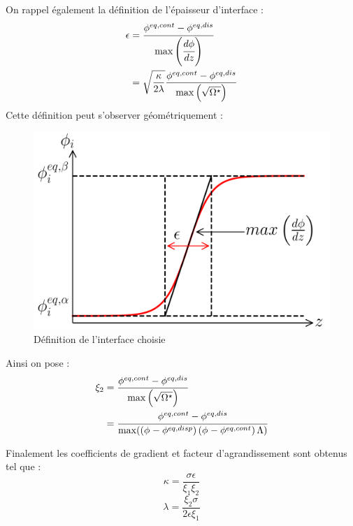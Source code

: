 On rappel également la définition de l'épaisseur d'interface :
\begin{align}
\epsilon&= \cfrac{\phi_{}^{eq,cont}-\phi_{}^{eq,dis}}{\max\left(\cfrac{d\phi_{}}{dz}\right)}
\\
&=\sqrt{\frac{\kappa}{2\lambda}}\frac{\phi^{eq,cont}-\phi^{eq,dis}}{\max\left(\sqrt{\Omega^{\star}}\right)}
\end{align}
Cette définition peut s'observer géométriquement :
\begin{figure}[H]
	\centering
	\includegraphics[width=0.3\linewidth]{figure/fig_interface}
	\caption{Définition de l'interface choisie}
	\label{fig:figinterface}
\end{figure}

Ainsi on pose :
\begin{align}
\xi_2&=\frac{\phi^{eq,cont}-\phi^{eq,dis}}{\max\left(\sqrt{\Omega^{\star}}\right)} \\
& = \cfrac{\phi^{eq,cont}-\phi^{eq,dis}}{\max({\left(\phi_{}-\phi_{}^{eq,disp}\right)\left(\phi_{}-\phi_{}^{eq,cont}\right)\Lambda})}
\end{align}

Finalement les coefficients de gradient et facteur d'agrandissement sont obtenus tel que : 
\begin{equation}
\kappa = \frac{\sigma \epsilon}{\xi_1 \xi_2}
\label{eq:kappa_potentiel_ternaire_}
\end{equation}
\begin{equation}
\lambda=\frac{\xi_2 \sigma}{2\epsilon\xi_1}
\label{eq:parametre_upscaling_potentiel_ternaire_}
\end{equation}